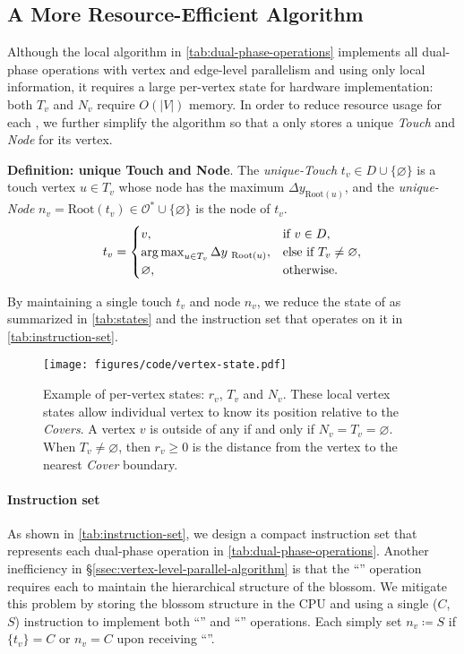 \subsection{A More Resource-Efficient Algorithm}\label{ssec:resource-efficient-algorithm}

Although the local algorithm in \autoref{tab:dual-phase-operations} implements all dual-phase operations with vertex and edge-level parallelism and using only local information, it requires a large per-vertex state for hardware implementation: both $T_v$ and $N_v$ require $O(|V|)$ memory.
In order to reduce resource usage for each \puv, we further simplify the algorithm so that a \puv only stores a unique \emph{Touch} and \emph{Node} for its vertex.

\textbf{Definition: unique Touch and Node}.
The \emph{unique-Touch} $t_v \in D \cup \{ \varnothing \}$ is a touch vertex $u \in T_v$ whose node has the maximum $\Delta y_{\text{Root}(u)}$, and the \emph{unique-Node} $n_v = \text{Root}(t_v) \in \mathcal{O}^* \cup \{ \varnothing \}$ is the node of $t_v$.
\begin{align*}
t_v = \begin{cases}
    v, & \text{if $v \in D$},\\
    \operatorname*{arg\,max}_{u \in T_v} \Delta y_{~\text{Root}(u)}, & \text{else if $T_v \neq \varnothing$},\\
    \varnothing, & \text{otherwise}.
\end{cases}
\end{align*}

By maintaining a single touch $t_v$ and node $n_v$, we reduce the state of \puv as summarized in \autoref{tab:states} and the instruction set that operates on it in \autoref{tab:instruction-set}.

\begin{figure}[t]
    \centering
    \texttt{[image: figures/code/vertex-state.pdf]}
    \caption{Example of per-vertex states: $r_v$, $T_v$ and $N_v$. These local vertex states allow individual vertex to know its position relative to the \emph{Covers}. A vertex $v$ is outside of any  if and only if $N_v = T_v = \varnothing$. When $T_v \neq \varnothing$, then $r_v \ge 0$ is the distance from the vertex to the nearest \emph{Cover} boundary.}
    \label{fig:vertex-state}
\end{figure}

\paragraph{Instruction set}
As shown in \autoref{tab:instruction-set}, we design a compact instruction set that represents each dual-phase operation in \autoref{tab:dual-phase-operations}.
Another inefficiency in \S\ref{ssec:vertex-level-parallel-algorithm} is that the ``'' operation requires each \puv to maintain the hierarchical structure of the blossom.
We mitigate this problem by storing the blossom structure in the CPU and using a single ($C$, $S$) instruction to implement both ``'' and ``'' operations.
Each \puv simply set $n_v \coloneq S$ if $\{t_v\} = C$ or $n_v = C$ upon receiving ``''.


